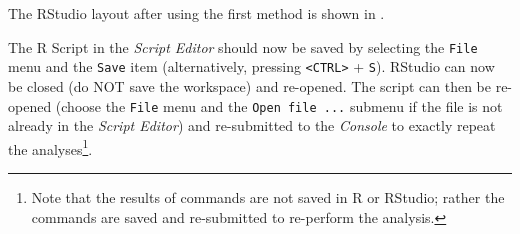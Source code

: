 \documentclass{article}\usepackage[]{graphicx}\usepackage[]{color}
\begin{document}
The RStudio layout after using the first method is shown in .

The R Script in the \textit{Script Editor} should now be saved by selecting the \texttt{File} menu and the \texttt{Save} item (alternatively, pressing \verb+<CTRL>+ + \verb+S+).  RStudio can now be closed (do NOT save the workspace) and re-opened.  The script can then be re-opened (choose the \texttt{File} menu and the \texttt{Open file ...} submenu if the file is not already in the \textit{Script Editor}) and re-submitted to the \textit{Console} to exactly repeat the analyses\footnote{Note that the results of commands are not saved in R or RStudio; rather the commands are saved and re-submitted to re-perform the analysis.}.
\end{document}
